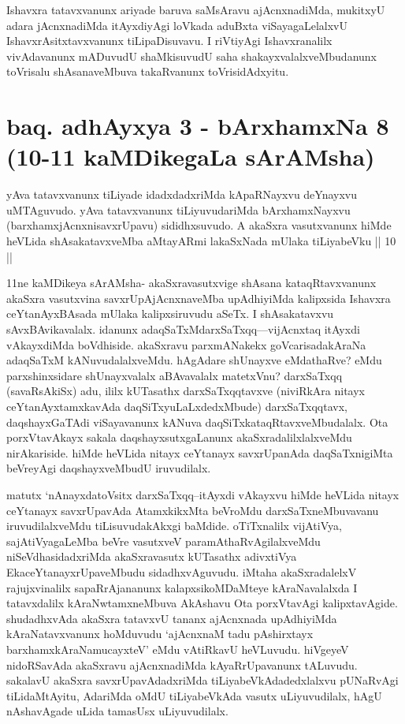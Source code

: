 \begin{artha}
Ishavxra tatavxvanunx ariyade baruva saMsAravu ajAcnxnadiMda, mukitxyU adara jAcnxnadiMda itAyxdiyAgi loVkada aduBxta viSayagaLelalxvU IshavxrAsitxtavxvanunx tiLipaDisuvavu. I riVtiyAgi Ishavxranalilx vivAdavanunx mADuvudU shaMkisuvudU saha shakayxvalalxveMbudanunx toVrisalu shAsanaveMbuva takaRvanunx toVrisidAdxyitu.
\end{artha}

\section*{baq. adhAyxya 3 - bArxhamxNa 8 (10-11 kaMDikegaLa sArAMsha)}

\begin{artha}
yAva tatavxvanunx tiLiyade idadxdadxriMda kApaRNayxvu deYnayxvu uMTAguvudo. yAva tatavxvanunx tiLiyuvudariMda bArxhamxNayxvu (barxhamxjAcnxnisavxrUpavu) sididhxsuvudo. A akaSxra vasutxvanunx hiMde heVLida shAsakatavxveMba aMtayARmi lakaSxNada mUlaka tiLiyabeVku || 10 ||
\end{artha}

\begin{artha}
11ne kaMDikeya sArAMsha- akaSxravasutxvige shAsana kataqRtavxvanunx akaSxra vasutxvina savxrUpAjAcnxnaveMba upAdhiyiMda kalipxsida Ishavxra ceYtanAyxBAsada mUlaka kalipxsiruvudu aSeTx. I shAsakatavxvu sAvxBAvikavalalx. idanunx adaqSaTxMdarxSaTxqq---vijAcnxtaq itAyxdi vAkayxdiMda boVdhiside. akaSxravu parxmANakekx goVcarisadakAraNa adaqSaTxM kANuvudalalxveMdu. hAgAdare shUnayxve eMdathaRve? eMdu parxshinxsidare shUnayxvalalx aBAvavalalx matetxVnu? darxSaTxqq (savaRsAkiSx) adu, ililx kUTasathx darxSaTxqqtavxve (niviRkAra nitayx ceYtanAyxtamxkavAda daqSiTxyuLaLxdedxMbude) darxSaTxqqtavx, daqshayxGaTAdi viSayavanunx kANuva daqSiTxkataqRtavxveMbudalalx. Ota porxVtavAkayx sakala daqshayxsutxgaLanunx akaSxradalilxlalxveMdu nirAkariside. hiMde heVLida nitayx ceYtanayx savxrUpanAda daqSaTxnigiMta beVreyAgi daqshayxveMbudU iruvudilalx. 
\end{artha}%

\begin{artha}
matutx `nAnayxdatoV\s sitx darxSaTxqq--itAyxdi vAkayxvu hiMde heVLida nitayx ceYtanayx savxrUpavAda AtamxkikxMta beVroMdu darxSaTxneMbuvavanu iruvudilalxveMdu tiLisuvudakAkxgi baMdide. oTiTxnalilx vijAtiVya, sajAtiVyagaLeMba beVre vasutxveV paramAthaRvAgilalxveMdu niSeVdhasidadxriMda akaSxravasutx kUTasathx adivxtiVya EkaceYtanayxrUpaveMbudu sidadhxvAguvudu. iMtaha akaSxradalelxV rajujxvinalilx sapaRrAjananunx kalapxsikoMDaMteye kAraNavalalxda I tatavxdalilx kAraNwtamxneMbuva AkAshavu Ota porxVtavAgi kalipxtavAgide. shudadhxvAda akaSxra tatavxvU tananx ajAcnxnada upAdhiyiMda kAraNatavxvanunx hoMduvudu `ajAcnxnaM tadu pAshirxtayx barxhamxkAraNamucayxteV' eMdu vAtiRkavU heVLuvudu. hiVgeyeV nidoRSavAda akaSxravu ajAcnxnadiMda kAyaRrUpavanunx tALuvudu. sakalavU akaSxra savxrUpavAdadxriMda tiLiyabeVkAdadedxlalxvu pUNaRvAgi tiLidaMtAyitu, AdariMda oMdU tiLiyabeVkAda vasutx uLiyuvudilalx, hAgU nAshavAgade uLida tamasUsx uLiyuvudilalx.
\end{artha}%

